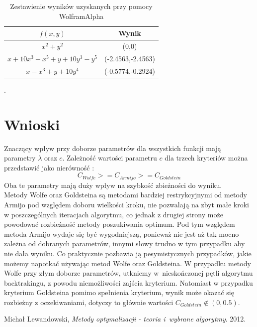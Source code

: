 \documentclass{classrep}
\begin{document}
\begin{table}[H]
	\begin{center}
	\begin{tabular}{|c|c|}
	\hline $f(x,y)$ & Wynik \\ 
	\hline $x^2+y^2$ & (0,0) \\ 
	\hline $x+10x^3-x^5 +y+10y^3-y^5$ & (-2.4563,-2.4563) \\ 
	\hline $x-x^3 +y+10y^4$ & (-0.5774,-0.2924) \\ 
	\hline 
	\end{tabular}
	\caption{Zestawienie wyników uzyskanych przy pomocy WolframAlpha }.
	\end{center}
\end{table}

\section{Wnioski}
Znaczący wpływ przy doborze parametrów dla wszystkich funkcji mają parametry $\lambda$ oraz $c$. Zależność wartości parametru $c$ dla trzech kryteriów można przedstawić jako nierówność :
\begin{equation}
C_{Wolfe} >= C_{Armijo} >= C_{Goldstein}
\end{equation}
Oba te parametry mają duży wpływ na szybkość zbieżności do wyniku.\\
Metody Wolfe oraz Goldsteina są metodami bardziej restrykcyjnymi od metody Armijo pod względem doboru wielkości kroku, nie pozwalają na zbyt małe kroki w poszczególnych iteracjach algorytmu, co jednak z drugiej strony może powodować rozbieżność metody poszukiwania optimum. Pod tym względem metoda Armijo wydaje się być wygodniejszą, ponieważ nie jest aż tak mocno zależna od dobranych parametrów, innymi słowy trudno w tym przypadku aby nie dała wyniku. Co praktycznie pozbawia ją pesymistycznych przypadków, jakie możemy napotkać używając metod Wolfe oraz Goldsteina. W przypadku metody Wolfe przy złym doborze parametrów, utkniemy w~nieskończonej pętli algorytmu backtrakingu, z powodu niemożliwości zajścia kryterium. Natomiast w przypadku kryterium Goldsteina pomimo spełnienia kryterium, wynik może okazać się rozbieżny z oczekiwaniami, dotyczy to głównie wartości $C_{Goldstein} \notin (0,0.5)$.


\begin{thebibliography}{9}
	Michał Lewandowski,  \emph{Metody optymalizacji - teoria i~wybrane algorytmy}.  2012.
\end{thebibliography}
\end{document}
